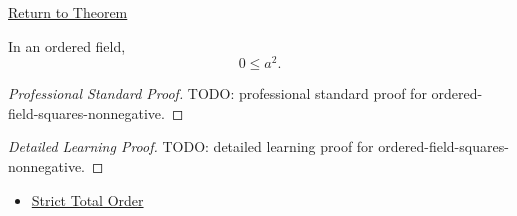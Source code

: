 \newpage
{}
\label{prf:ordered-field-squares-nonnegative}

\begin{remark*}[Return]
\hyperref[prop:product-of-positives-is-positive-q]{Return to Theorem}
\end{remark*}

\begin{proposition*}
In an ordered field,
\[
0\le a^2.
\]
\end{proposition*}

\begin{proof}[Professional Standard Proof]
\LRAProofBodyStart
TODO: professional standard proof for ordered-field-squares-nonnegative.
\end{proof}

\begin{proof}[Detailed Learning Proof]
\LRAProofBodyStart
TODO: detailed learning proof for ordered-field-squares-nonnegative.
\end{proof}

\begin{remark*}
\end{remark*}

\begin{dependencies}
\begin{itemize}
  \item \hyperref[def:strict-total-order]{Strict Total Order}
\end{itemize}
\end{dependencies}

\clearpage
